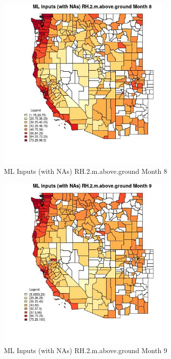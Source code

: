 \begin{figure} 
\centering  
\includegraphics[width=0.77\textwidth]{Code_Outputs/Report_ML_input_PM25_Step4_part_f_de_duplicated_aves_prioritize_24hr_obswNAs_CountyRH2mabovegroundmedianMonth8.jpg} 
\caption{\label{fig:Report_ML_input_PM25_Step4_part_f_de_duplicated_aves_prioritize_24hr_obswNAsCountyRH2mabovegroundmedianMonth8}ML Inputs (with NAs) RH.2.m.above.ground Month 8} 
\end{figure} 
 

\begin{figure} 
\centering  
\includegraphics[width=0.77\textwidth]{Code_Outputs/Report_ML_input_PM25_Step4_part_f_de_duplicated_aves_prioritize_24hr_obswNAs_CountyRH2mabovegroundmedianMonth9.jpg} 
\caption{\label{fig:Report_ML_input_PM25_Step4_part_f_de_duplicated_aves_prioritize_24hr_obswNAsCountyRH2mabovegroundmedianMonth9}ML Inputs (with NAs) RH.2.m.above.ground Month 9} 
\end{figure} 
 


